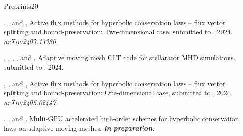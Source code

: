 %
\begin{cvpublicationsection}{Preprints}{20}
%
\item {}, , and , Active flux methods for hyperbolic conservation laws -- flux vector splitting and bound-preservation: Two-dimensional case, submitted to , 2024. \href{https://arxiv.org/abs/2407.13380}{\em arXiv:2407.13380}.
%
\item {}, , , , and , Adaptive moving mesh CLT code for stellarator MHD simulations, submitted to , 2024.
%
\item {}, , and , Active flux methods for hyperbolic conservation laws -- flux vector splitting and bound-preservation: One-dimensional case, submitted to , 2024. \href{https://arxiv.org/abs/2405.02447}{\em arXiv:2405.02447}.
%
\item {}, , and , Multi-GPU accelerated high-order schemes for hyperbolic conservation laws on adaptive moving meshes, {\em\bfseries in preparation}.
\end{cvpublicationsection}
